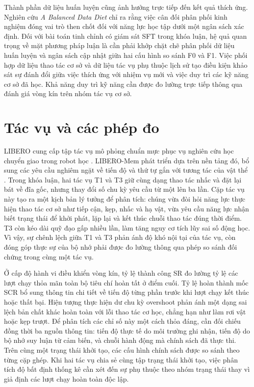 Thành phần dữ liệu huấn luyện cũng ảnh hưởng trực tiếp đến kết quả thích ứng. Nghiên cứu \textit{A Balanced Data Diet} \cite{balanceddiet2026} chỉ ra rằng việc cân đối phân phối kinh nghiệm đóng vai trò then chốt đối với năng lực học tập dưới một ngân sách xác định. Đối với bài toán tinh chỉnh có giám sát SFT trong khóa luận, hệ quả quan trọng về mặt phương pháp luận là cần phải khớp chặt chẽ phân phối dữ liệu huấn luyện và ngân sách cập nhật giữa hai cấu hình so sánh F0 và F1. Việc phối hợp dữ liệu thao tác cơ sở và dữ liệu tác vụ phụ thuộc lịch sử tạo điều kiện khảo sát sự đánh đổi giữa việc thích ứng với nhiệm vụ mới và việc duy trì các kỹ năng cơ sở đã học. Khả năng duy trì kỹ năng cần được đo lường trực tiếp thông qua đánh giá vòng kín trên nhóm tác vụ cơ sở.

\section{Tác vụ và các phép đo}

LIBERO cung cấp tập tác vụ mô phỏng chuẩn mực phục vụ nghiên cứu học chuyển giao trong robot học \cite{libero2023}. LIBERO-Mem phát triển dựa trên nền tảng đó, bổ sung các yêu cầu nghiêm ngặt về tiến độ và thứ tự gắn với tương tác của vật thể \cite{liberomem2025}. Trong khóa luận, hai tác vụ T1 và T3 giữ cùng dạng thao tác nhấc và đặt lại bát về đĩa gốc, nhưng thay đổi số chu kỳ yêu cầu từ một lên ba lần. Cặp tác vụ này tạo ra một kịch bản lý tưởng để phân tích: chúng vừa đòi hỏi năng lực thực hiện thao tác cơ sở như tiếp cận, kẹp, nhấc và hạ vật, vừa yêu cầu năng lực nhận biết trạng thái để khởi phát, lặp lại và kết thúc chuỗi thao tác đúng thời điểm. T3 còn kéo dài quỹ đạo gấp nhiều lần, làm tăng nguy cơ tích lũy sai số động học. Vì vậy, sự chênh lệch giữa T1 và T3 phản ánh độ khó nội tại của tác vụ, còn đóng góp thực sự của bộ nhớ phải được đo lường thông qua phép so sánh đối chứng trong cùng một tác vụ.

Ở cấp độ hành vi điều khiển vòng kín, tỷ lệ thành công SR đo lường tỷ lệ các lượt chạy thỏa mãn toàn bộ tiêu chí hoàn tất ở điểm cuối. Tỷ lệ hoàn thành mốc SCR bổ sung thông tin chi tiết về tiến độ từng phần trước khi lượt chạy kết thúc hoặc thất bại. Hiện tượng thực hiện dư chu kỳ overshoot phản ánh một dạng sai lệch bản chất khác hoàn toàn với lỗi thao tác cơ học, chẳng hạn như làm rơi vật hoặc kẹp trượt. Để phân tích các chỉ số này một cách thỏa đáng, cần đối chiếu đồng thời ba nguồn thông tin: tiến độ thực tế do môi trường ghi nhận, tiến độ do bộ nhớ suy luận từ cảm biến, và chuỗi hành động mà chính sách đã thực thi. Trên cùng một trạng thái khởi tạo, các cấu hình chính sách được so sánh theo từng cặp ghép. Khi hai tác vụ chia sẻ cùng tập trạng thái khởi tạo, việc phân tích độ bất định thống kê cần xét đến sự phụ thuộc theo nhóm trạng thái thay vì giả định các lượt chạy hoàn toàn độc lập.

